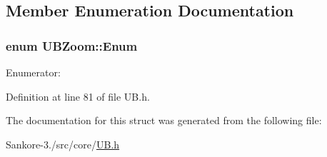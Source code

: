 \subsection{Member Enumeration Documentation}
\hypertarget{struct_u_b_zoom_a119069dae00f2d655bb143373d1954f7}{
\subsubsection[{Enum}]{\setlength{\rightskip}{0pt plus 5cm}enum {\bf U\-B\-Zoom\-::\-Enum}}}\label{d9/dcf/struct_u_b_zoom_a119069dae00f2d655bb143373d1954f7}
\begin{Desc}
\item[Enumerator\-: ]\par
\begin{description}
\item[{\em 
\hypertarget{struct_u_b_zoom_a119069dae00f2d655bb143373d1954f7a00661f1d9c78b272f02928cfd6987cf3}{Small}\label{d9/dcf/struct_u_b_zoom_a119069dae00f2d655bb143373d1954f7a00661f1d9c78b272f02928cfd6987cf3}
}]\item[{\em 
\hypertarget{struct_u_b_zoom_a119069dae00f2d655bb143373d1954f7aa27ba67444fecbf1f0c6a18f4d45e89d}{Medium}\label{d9/dcf/struct_u_b_zoom_a119069dae00f2d655bb143373d1954f7aa27ba67444fecbf1f0c6a18f4d45e89d}
}]\item[{\em 
\hypertarget{struct_u_b_zoom_a119069dae00f2d655bb143373d1954f7aaf4113207fe448050bdf6877573a4328}{Large}\label{d9/dcf/struct_u_b_zoom_a119069dae00f2d655bb143373d1954f7aaf4113207fe448050bdf6877573a4328}
}]\end{description}
\end{Desc}



Definition at line 81 of file U\-B.\-h.



The documentation for this struct was generated from the following file\-:\begin{DoxyCompactItemize}
\item 
Sankore-\/3./src/core/\hyperlink{_u_b_8h}{U\-B.\-h}\end{DoxyCompactItemize}
